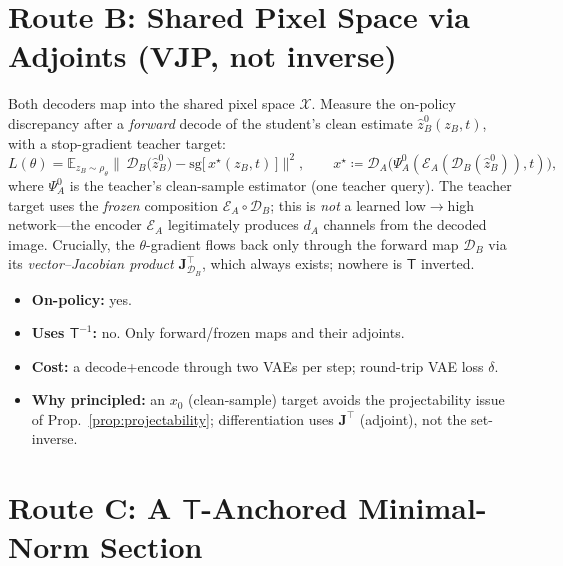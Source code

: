\documentclass[11pt,a4paper]{article}
\newcommand{\E}{\mathbb{E}}
\newcommand{\sg}{\mathrm{sg}}
\newcommand{\Xspace}{\mathcal{X}}
\newcommand{\Enc}{\mathcal{E}}
\newcommand{\Dec}{\mathcal{D}}
\newcommand{\Tmap}{\mathsf{T}}
\newcommand{\Tinv}{\mathsf{T}^{-1}}
\newcommand{\Jac}{\mathbf{J}}
\theoremstyle{definition}
\begin{document}
\section{Route B: Shared Pixel Space via Adjoints (VJP, not inverse)}
\label{sec:routeB}

Both decoders map into the shared pixel space $\Xspace$. Measure the on-policy discrepancy after
a \emph{forward} decode of the student's clean estimate
$\hat z_B^{0}(z_B,t)$, with a stop-gradient teacher target:
\begin{equation}
L(\theta)=\E_{z_B\sim\rho_\theta}\Big\|\,\Dec_B\big(\hat z_B^{0}\big)
-\sg\!\big[\,x^\star(z_B,t)\,\big]\Big\|^2,
\qquad
x^\star \coloneqq \Dec_A\big(\Psi_A^{0}(\Enc_A(\Dec_B(\hat z_B^{0})),t)\big),
\label{eq:pixel}
\end{equation}
where $\Psi_A^{0}$ is the teacher's clean-sample estimator (one teacher query). The teacher
target uses the \emph{frozen} composition $\Enc_A\circ\Dec_B$; this is \emph{not} a learned
low$\to$high network---the encoder $\Enc_A$ legitimately produces $d_A$ channels from the
decoded image. Crucially, the $\theta$-gradient flows back only through the forward map $\Dec_B$
via its \emph{vector--Jacobian product} $\Jac_{\Dec_B}^{\!\top}$, which always exists; nowhere is
$\Tmap$ inverted.
\begin{itemize}[leftmargin=1.4em,itemsep=2pt]
  \item \textbf{On-policy:} yes.
  \item \textbf{Uses $\Tinv$:} no. Only forward/frozen maps and their adjoints.
  \item \textbf{Cost:} a decode+encode through two VAEs per step; round-trip VAE loss $\delta$.
  \item \textbf{Why principled:} an $x_0$ (clean-sample) target avoids the projectability issue of
        Prop.~\ref{prop:projectability}; differentiation uses $\Jac^{\top}$ (adjoint), not the
        set-inverse.
\end{itemize}

\section{Route C: A $\Tmap$-Anchored Minimal-Norm Section}
\label{sec:routeC}
\end{document}
